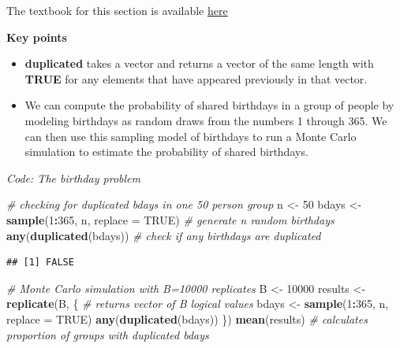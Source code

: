 \documentclass[
]{article}
\newenvironment{Shaded}{\begin{snugshade}}{\end{snugshade}}
\newcommand{\CommentTok}[1]{\textcolor[rgb]{0.56,0.35,0.01}{\textit{#1}}}
\newcommand{\DataTypeTok}[1]{\textcolor[rgb]{0.13,0.29,0.53}{#1}}
\newcommand{\DecValTok}[1]{\textcolor[rgb]{0.00,0.00,0.81}{#1}}
\newcommand{\KeywordTok}[1]{\textcolor[rgb]{0.13,0.29,0.53}{\textbf{#1}}}
\newcommand{\NormalTok}[1]{#1}
\newcommand{\OperatorTok}[1]{\textcolor[rgb]{0.81,0.36,0.00}{\textbf{#1}}}
\newcommand{\OtherTok}[1]{\textcolor[rgb]{0.56,0.35,0.01}{#1}}
\newcommand{\StringTok}[1]{\textcolor[rgb]{0.31,0.60,0.02}{#1}}
\providecommand{\tightlist}{%
  \setlength{\itemsep}{0pt}\setlength{\parskip}{0pt}}
\begin{document}
The textbook for this section is available
\href{https://rafalab.github.io/dsbook/probability.html\#birthday-problem}{here}

\textbf{Key points}

\begin{itemize}
\tightlist
\item
  \textbf{duplicated} takes a vector and returns a vector of the same
  length with \textbf{TRUE} for any elements that have appeared
  previously in that vector.
\item
  We can compute the probability of shared birthdays in a group of
  people by modeling birthdays as random draws from the numbers 1
  through 365. We can then use this sampling model of birthdays to run a
  Monte Carlo simulation to estimate the probability of shared
  birthdays.
\end{itemize}

\emph{Code: The birthday problem}

\begin{Shaded}
\begin{Highlighting}[]
\CommentTok{\# checking for duplicated bdays in one 50 person group}
\NormalTok{n \textless{}{-}}\StringTok{ }\DecValTok{50}
\NormalTok{bdays \textless{}{-}}\StringTok{ }\KeywordTok{sample}\NormalTok{(}\DecValTok{1}\OperatorTok{:}\DecValTok{365}\NormalTok{, n, }\DataTypeTok{replace =} \OtherTok{TRUE}\NormalTok{)    }\CommentTok{\# generate n random birthdays}
\KeywordTok{any}\NormalTok{(}\KeywordTok{duplicated}\NormalTok{(bdays))    }\CommentTok{\# check if any birthdays are duplicated}
\end{Highlighting}
\end{Shaded}

\begin{verbatim}
## [1] FALSE
\end{verbatim}

\begin{Shaded}
\begin{Highlighting}[]
\CommentTok{\# Monte Carlo simulation with B=10000 replicates}
\NormalTok{B \textless{}{-}}\StringTok{ }\DecValTok{10000}
\NormalTok{results \textless{}{-}}\StringTok{ }\KeywordTok{replicate}\NormalTok{(B, \{    }\CommentTok{\# returns vector of B logical values}
\NormalTok{    bdays \textless{}{-}}\StringTok{ }\KeywordTok{sample}\NormalTok{(}\DecValTok{1}\OperatorTok{:}\DecValTok{365}\NormalTok{, n, }\DataTypeTok{replace =} \OtherTok{TRUE}\NormalTok{)}
    \KeywordTok{any}\NormalTok{(}\KeywordTok{duplicated}\NormalTok{(bdays))}
\NormalTok{\})}
\KeywordTok{mean}\NormalTok{(results)    }\CommentTok{\# calculates proportion of groups with duplicated bdays}
\end{Highlighting}
\end{Shaded}
\end{document}
